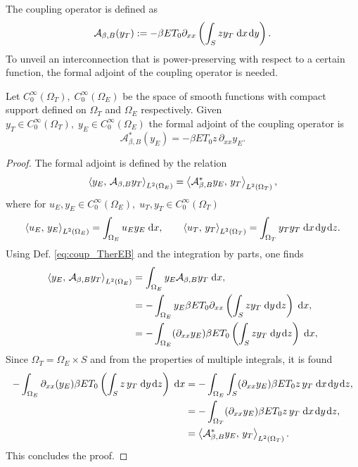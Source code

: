 The coupling operator is defined as
\begin{equation}\label{eq:coup_TherEB}
	\mathcal{A}_{\beta, B}(y_T) := - \beta E T_0 \partial_{xx} \left(\int_S z y_T \d{x}\d{y}\right).
\end{equation}
To unveil an interconnection that is power-preserving with respect to a certain function, the formal adjoint of the coupling operator is needed.
\begin{proposition}\label{prop:adjcoup_TherEB}
	Let $C_0^{\infty}(\Omega_T), \; C_0^{\infty}(\Omega_E)$ be the space of smooth functions with compact support defined on $\Omega_T$ and $\Omega_E$ respectively. Given $y_T \in C_0^{\infty}(\Omega_T), \; y_E \in C_0^{\infty}(\Omega_E)$ the formal adjoint of the coupling operator is 
	\begin{equation}\label{eq:adjcoup_TherEB}
		\mathcal{A}_{\beta, B}^*(y_E) = -\beta E T_0 z \, \partial_{xx} y_E.
	\end{equation}
	\begin{proof}
		The formal adjoint is defined by the relation
		\begin{equation}
		\inner[L^2(\Omega_E)]{y_E}{\mathcal{A}_{\beta, B}y_T}= \inner[L^2(\Omega_T)]{\mathcal{A}_{\beta, B}^* y_E}{y_T},
		\end{equation}
		where for $u_E, y_E \in C_0^{\infty}(\Omega_E), \; u_T, y_T \in C_0^{\infty}(\Omega_T)$
		\begin{equation}
		\inner[L^2(\Omega_E)]{u_E}{y_E} = \int_{\Omega_E} u_E y_E \d{x}, \qquad \inner[L^2(\Omega_T)]{u_T}{y_T} = \int_{\Omega_T} y_T y_T \d{x}\d{y}\d{z}.
		\end{equation}
		Using Def. \eqref{eq:coup_TherEB} and the integration by parts, one finds
		\begin{equation}
		\begin{aligned}
		\inner[L^2(\Omega_E)]{y_E}{\mathcal{A}_{\beta, B}y_T}&=\int_{\Omega_E} y_E \mathcal{A}_{\beta, B}y_T \d{x}, \\
		&= -\int_{\Omega_E} y_E \beta E T_0 \partial_{xx} \left(\int_S z y_T \d{y}\d{z}\right) \d{x}, \\
		&= -\int_{\Omega_E} (\partial_{xx} y_E) \beta E T_0 \left(\int_S z y_T \d{y}\d{z}\right) \d{x}, \\
		\end{aligned}
		\end{equation}
		Since $\Omega_T = \Omega_E \times S$ and from the properties of multiple integrals, it is found
		\begin{equation}
		\begin{aligned}
		-\int_{\Omega_E} \partial_{xx} (y_E) \beta E T_0 \left(\int_S z\, y_T \d{y}\d{z}\right) \d{x} &= -\int_{\Omega_E}\int_S  (\partial_{xx} y_E) \beta E T_0 z \, y_T \d{x}\d{y}\d{z}, \\
		&= -\int_{\Omega_T}(\partial_{xx} y_E) \beta E T_0 z \, y_T \d{x}\d{y}\d{z}, \\
		&=	\inner[L^2(\Omega_T)]{\mathcal{A}_{\beta, B}^* y_E}{y_T}.
		\end{aligned}
		\end{equation}
		This concludes the proof.
	\end{proof}
\end{proposition}

